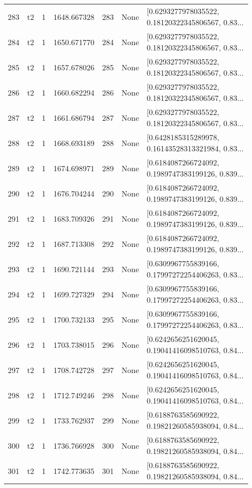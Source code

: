 \begin{tabular}{lllrlll}
283 &  t2 &   1 &  1648.667328 &  283 &  None &  [0.6293277978035522, 0.18120322345806567, 0.83... \\
284 &  t2 &   1 &  1650.671770 &  284 &  None &  [0.6293277978035522, 0.18120322345806567, 0.83... \\
285 &  t2 &   1 &  1657.678026 &  285 &  None &  [0.6293277978035522, 0.18120322345806567, 0.83... \\
286 &  t2 &   1 &  1660.682294 &  286 &  None &  [0.6293277978035522, 0.18120322345806567, 0.83... \\
287 &  t2 &   1 &  1661.686794 &  287 &  None &  [0.6293277978035522, 0.18120322345806567, 0.83... \\
288 &  t2 &   1 &  1668.693189 &  288 &  None &  [0.6428185315289978, 0.16143528313321984, 0.83... \\
289 &  t2 &   1 &  1674.698971 &  289 &  None &  [0.6184087266724092, 0.1989747383199126, 0.839... \\
290 &  t2 &   1 &  1676.704244 &  290 &  None &  [0.6184087266724092, 0.1989747383199126, 0.839... \\
291 &  t2 &   1 &  1683.709326 &  291 &  None &  [0.6184087266724092, 0.1989747383199126, 0.839... \\
292 &  t2 &   1 &  1687.713308 &  292 &  None &  [0.6184087266724092, 0.1989747383199126, 0.839... \\
293 &  t2 &   1 &  1690.721144 &  293 &  None &  [0.6309967755839166, 0.17997272254406263, 0.83... \\
294 &  t2 &   1 &  1699.727329 &  294 &  None &  [0.6309967755839166, 0.17997272254406263, 0.83... \\
295 &  t2 &   1 &  1700.732133 &  295 &  None &  [0.6309967755839166, 0.17997272254406263, 0.83... \\
296 &  t2 &   1 &  1703.738015 &  296 &  None &  [0.6242656251620045, 0.19041416098510763, 0.84... \\
297 &  t2 &   1 &  1708.742728 &  297 &  None &  [0.6242656251620045, 0.19041416098510763, 0.84... \\
298 &  t2 &   1 &  1712.749246 &  298 &  None &  [0.6242656251620045, 0.19041416098510763, 0.84... \\
299 &  t2 &   1 &  1733.762937 &  299 &  None &  [0.6188763585690922, 0.19821260585938094, 0.84... \\
300 &  t2 &   1 &  1736.766928 &  300 &  None &  [0.6188763585690922, 0.19821260585938094, 0.84... \\
301 &  t2 &   1 &  1742.773635 &  301 &  None &  [0.6188763585690922, 0.19821260585938094, 0.84... \\

\end{tabular}
